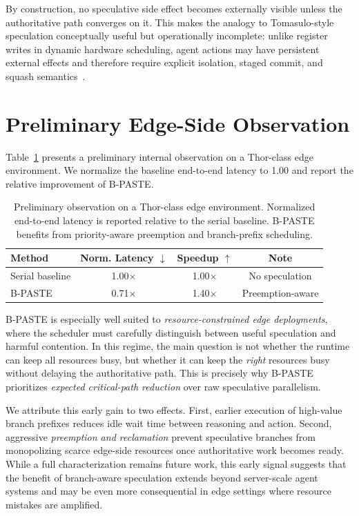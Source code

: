 \documentclass[10pt,twocolumn]{article}
\begin{document}
By construction, no speculative side effect becomes externally visible unless the authoritative path converges on it. This makes the analogy to Tomasulo-style speculation conceptually useful but operationally incomplete: unlike register writes in dynamic hardware scheduling, agent actions may have persistent external effects and therefore require explicit isolation, staged commit, and squash semantics~\cite{tomasulo}.

\section{Preliminary Edge-Side Observation}

Table~\ref{tab:thor} presents a preliminary internal observation on a Thor-class edge environment. We normalize the baseline end-to-end latency to 1.00 and report the relative improvement of B-PASTE.

\begin{table}[t]
\centering
\small
\caption{Preliminary observation on a Thor-class edge environment. Normalized end-to-end latency is reported relative to the serial baseline. B-PASTE benefits from priority-aware preemption and branch-prefix scheduling.}
\label{tab:thor}
\begin{tabular}{lccc}
\toprule
Method & Norm. Latency $\downarrow$ & Speedup $\uparrow$ & Note \\
\midrule
Serial baseline & 1.00$\times$ & 1.00$\times$ & No speculation \\
B-PASTE & 0.71$\times$ & 1.40$\times$ & Preemption-aware \\
\bottomrule
\end{tabular}
\end{table}


B-PASTE is especially well suited to \emph{resource-constrained edge deployments}, where the scheduler must carefully distinguish between useful speculation and harmful contention. In this regime, the main question is not whether the runtime can keep all resources busy, but whether it can keep the \emph{right} resources busy without delaying the authoritative path. This is precisely why B-PASTE prioritizes \emph{expected critical-path reduction} over raw speculative parallelism.


We attribute this early gain to two effects. First, earlier execution of high-value branch prefixes reduces idle wait time between reasoning and action. Second, aggressive \emph{preemption and reclamation} prevent speculative branches from monopolizing scarce edge-side resources once authoritative work becomes ready. While a full characterization remains future work, this early signal suggests that the benefit of branch-aware speculation extends beyond server-scale agent systems and may be even more consequential in edge settings where resource mistakes are amplified.
\end{document}
